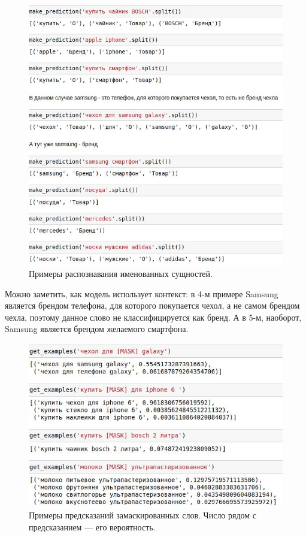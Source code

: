 \documentclass[12pt,a4paper]{article}
\begin{document}
\begin{figure}[H]
	\begin{center}
		\includegraphics[scale=0.8]{ner.jpg}
	\end{center}
	\caption{Примеры распознавания именованных сущностей.}
\end{figure}

\noindent Можно заметить, как модель использует контекст: в 4-м примере Samsung является брендом телефона, для которого покупается чехол, а не самом брендом чехла, поэтому данное слово не классифицируется как бренд. А в 5-м, наоборот, Samsung является брендом желаемого смартфона.

\begin{figure}[H]
	\begin{center}
		\includegraphics[scale=0.8]{mlm.jpg}
	\end{center}
	\caption{Примеры предсказаний замаскированных слов. Число рядом с предсказанием --- его вероятность.}
\end{figure}
\end{document}
